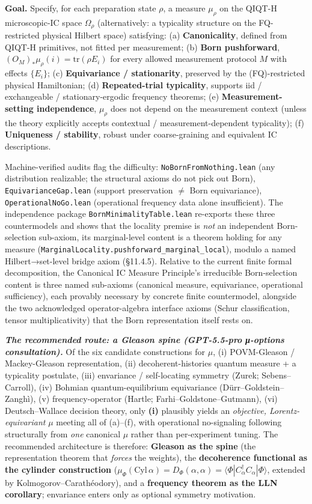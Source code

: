 \documentclass[11pt,a4paper]{article}
\begin{document}
\textbf{Goal.} Specify, for each preparation state $\rho$, a measure $\mu_\rho$ on the QIQT-H microscopic-IC space $\Omega_\rho$ (alternatively: a typicality structure on the FQ-restricted physical Hilbert space) satisfying:
   (a) \textbf{Canonicality}, defined from QIQT-H primitives, not fitted per measurement;
   (b) \textbf{Born pushforward}, $(O_M)_* \mu_\rho(i) = \mathrm{tr}(\rho E_i)$ for every allowed measurement protocol $M$ with effects $\{E_i\}$;
   (c) \textbf{Equivariance / stationarity}, preserved by the (FQ)-restricted physical Hamiltonian;
   (d) \textbf{Repeated-trial typicality}, supports iid / exchangeable / stationary-ergodic frequency theorems;
   (e) \textbf{Measurement-setting independence}, $\mu_\rho$ does not depend on the measurement context (unless the theory explicitly accepts contextual / measurement-dependent typicality);
   (f) \textbf{Uniqueness / stability}, robust under coarse-graining and equivalent IC descriptions.

Machine-verified audits flag the difficulty: \texttt{NoBornFromNothing.lean} (any distribution realizable; the structural axioms do not pick out Born), \texttt{EquivarianceGap.lean} (support preservation $\neq$ Born equivariance), \texttt{OperationalNoGo.lean} (operational frequency data alone insufficient). The independence package \texttt{BornMinimalityTable.lean} re-exports these three countermodels and shows that the locality premise is \emph{not} an independent Born-selection sub-axiom, its marginal-level content is a theorem holding for any measure (\texttt{MarginalLocality.pushforward\_marginal\_local}), modulo a named Hilbert→set-level bridge axiom (§11.4.5). Relative to the current finite formal decomposition, the Canonical IC Measure Principle's irreducible Born-selection content is three named sub-axioms (canonical measure, equivariance, operational sufficiency), each provably necessary by concrete finite countermodel, alongside the two acknowledged operator-algebra interface axioms (Schur classification, tensor multiplicativity) that the Born representation itself rests on.

\emph{\textbf{The recommended route: a Gleason spine (GPT-5.5-pro μ-options consultation).}} Of the six candidate constructions for $\mu$, (i) POVM-Gleason / Mackey-Gleason representation, (ii) decoherent-histories quantum measure + a typicality postulate, (iii) envariance / self-locating symmetry (Zurek; Sebens–Carroll), (iv) Bohmian quantum-equilibrium equivariance (Dürr–Goldstein–Zanghì), (v) frequency-operator (Hartle; Farhi–Goldstone–Gutmann), (vi) Deutsch–Wallace decision theory, only \textbf{(i)} plausibly yields an \emph{objective, Lorentz-equivariant} $\mu$ meeting all of (a)–(f), with operational no-signaling following structurally from \emph{one} canonical $\mu$ rather than per-experiment tuning. The recommended architecture is therefore: \textbf{Gleason as the spine} (the representation theorem that \emph{forces} the weights), the \textbf{decoherence functional as the cylinder construction} ($\mu_\Phi(\mathrm{Cyl}\,\alpha) = D_\Phi(\alpha,\alpha) = \langle\Phi|C_\alpha^\dagger C_\alpha|\Phi\rangle$, extended by Kolmogorov–Carathéodory), and a \textbf{frequency theorem as the LLN corollary}; envariance enters only as optional symmetry motivation.
\end{document}
